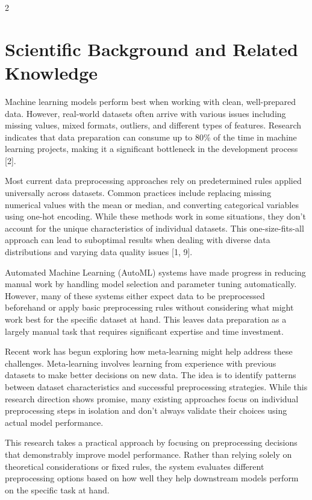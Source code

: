 \documentclass[11pt,a4paper]{article}
\begin{document}
\setlength{\columnsep}{0.8cm}
\setlength{\columnseprule}{0.4pt}
\begin{multicols}{2}

\section{Scientific Background and Related Knowledge}

Machine learning models perform best when working with clean, well-prepared data. However, real-world datasets often arrive with various issues including missing values, mixed formats, outliers, and different types of features. Research indicates that data preparation can consume up to 80\% of the time in machine learning projects, making it a significant bottleneck in the development process [2].

Most current data preprocessing approaches rely on predetermined rules applied universally across datasets. Common practices include replacing missing numerical values with the mean or median, and converting categorical variables using one-hot encoding. While these methods work in some situations, they don't account for the unique characteristics of individual datasets. This one-size-fits-all approach can lead to suboptimal results when dealing with diverse data distributions and varying data quality issues [1, 9].

Automated Machine Learning (AutoML) systems have made progress in reducing manual work by handling model selection and parameter tuning automatically. However, many of these systems either expect data to be preprocessed beforehand or apply basic preprocessing rules without considering what might work best for the specific dataset at hand. This leaves data preparation as a largely manual task that requires significant expertise and time investment.

Recent work has begun exploring how meta-learning might help address these challenges. Meta-learning involves learning from experience with previous datasets to make better decisions on new data. The idea is to identify patterns between dataset characteristics and successful preprocessing strategies. While this research direction shows promise, many existing approaches focus on individual preprocessing steps in isolation and don't always validate their choices using actual model performance.

This research takes a practical approach by focusing on preprocessing decisions that demonstrably improve model performance. Rather than relying solely on theoretical considerations or fixed rules, the system evaluates different preprocessing options based on how well they help downstream models perform on the specific task at hand.



\end{multicols}
\end{document}
